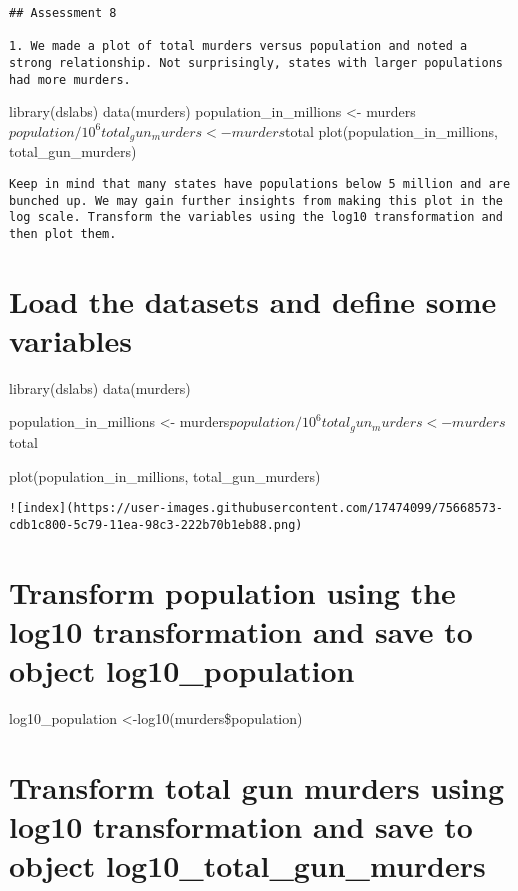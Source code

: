 \documentclass[
]{article}
\begin{document}
\begin{verbatim}
## Assessment 8

1. We made a plot of total murders versus population and noted a strong relationship. Not surprisingly, states with larger populations had more murders.
\end{verbatim}

library(dslabs) data(murders) population\_in\_millions \textless-
murders\(population/10^6 total_gun_murders <− murders\)total
plot(population\_in\_millions, total\_gun\_murders)

\begin{verbatim}
Keep in mind that many states have populations below 5 million and are bunched up. We may gain further insights from making this plot in the log scale. Transform the variables using the log10 transformation and then plot them.
\end{verbatim}

\hypertarget{load-the-datasets-and-define-some-variables}{%
\section{Load the datasets and define some
variables}\label{load-the-datasets-and-define-some-variables}}

library(dslabs) data(murders)

population\_in\_millions \textless-
murders\(population/10^6 total_gun_murders <- murders\)total

plot(population\_in\_millions, total\_gun\_murders)

\begin{verbatim}
![index](https://user-images.githubusercontent.com/17474099/75668573-cdb1c800-5c79-11ea-98c3-222b70b1eb88.png)
\end{verbatim}

\hypertarget{transform-population-using-the-log10-transformation-and-save-to-object-log10_population}{%
\section{Transform population using the log10 transformation and save to
object
log10\_population}\label{transform-population-using-the-log10-transformation-and-save-to-object-log10_population}}

log10\_population \textless-log10(murders\$population)

\hypertarget{transform-total-gun-murders-using-log10-transformation-and-save-to-object-log10_total_gun_murders}{%
\section{Transform total gun murders using log10 transformation and save
to object
log10\_total\_gun\_murders}\label{transform-total-gun-murders-using-log10-transformation-and-save-to-object-log10_total_gun_murders}}
\end{document}
